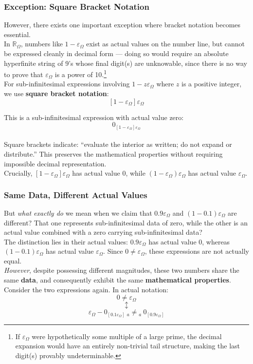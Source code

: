 \documentclass{article}
\begin{document}
\subsubsection*{Exception: Square Bracket Notation}

However, there exists one important exception where bracket notation becomes essential.
\\In $\mathbb{R}_\Omega$, numbers like $1 - \varepsilon_\Omega$ exist as actual values 
on the number line, but cannot be expressed cleanly in decimal form --- doing so would 
require an absolute hyperfinite string of 9's whose final digit(s) are unknowable, 
since there is no way to prove that $\varepsilon_\Omega$ is a power of 10.\footnote{If 
$\varepsilon_\Omega$ were hypothetically some multiple of a large prime, the decimal 
expansion would have an entirely non-trivial tail structure, making the last digit(s) 
provably undeterminable.}
\\For sub-infinitesimal expressions involving $1 - z\varepsilon_\Omega$ where $z$ is a positive integer, we use \textbf{square bracket notation}:
$$[1 - \varepsilon_\Omega]\varepsilon_\Omega$$

This is a sub-infinitesimal expression with actual value zero:
$$0_{[1 - \varepsilon_\Omega]\varepsilon_\Omega}$$
\\Square brackets indicate: ``evaluate the interior as written; do not expand or distribute.'' This preserves the mathematical properties without requiring impossible decimal representation.
\\Crucially, $[1 - \varepsilon_\Omega]\varepsilon_\Omega$ has actual value $0$, while $(1 - \varepsilon_\Omega)\varepsilon_\Omega$ has actual value $\varepsilon_\Omega$.

\subsubsection{Same Data, Different Actual Values}

But \textit{what exactly do} we mean when we claim that $0.9\varepsilon_\Omega$ and $(1-0.1)\varepsilon_\Omega$ are different? That one represents sub-infinitesimal data of zero, while the other is an actual value combined with a zero carrying sub-infinitesimal data?
\\The distinction lies in their actual values: $0.9\varepsilon_\Omega$ has actual value 0, whereas $(1-0.1)\varepsilon_\Omega$ has actual value $\varepsilon_\Omega$. Since $0\neq\varepsilon_\Omega$, these expressions are not actually equal.
\\\textit{However}, despite possessing different magnitudes, these two numbers share the same \textbf{data}, and consequently exhibit the same \textbf{mathematical properties}.
\\Consider the two expressions again. In actual notation:
$$0\neq\varepsilon_\Omega$$
$$\updownarrow$$
$$\varepsilon_\Omega - 0_{[0.1\varepsilon_\Omega]} \ {}_a{\neq}{}_a \ 0_{[0.9\varepsilon_\Omega]}$$
\end{document}

